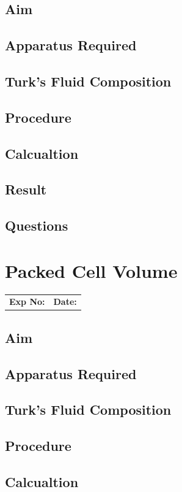 \documentclass[a4paper,12pt]{book}
\begin{document}
	\section*{Aim}
	\section*{Apparatus Required}
	\section*{Turk's Fluid Composition}
	\section*{Procedure}
	\section*{Calcualtion}
	\section*{Result}
	\section*{Questions}


\chapter*{\centering Packed Cell Volume}
		\begin{tabular}{p{5in} p{1in}}
			\textbf{Exp No:}  & \textbf{Date:}\\
		\end{tabular}
	\section*{Aim}
	\section*{Apparatus Required}
	\section*{Turk's Fluid Composition}
	\section*{Procedure}
	\section*{Calcualtion}
\end{document}
